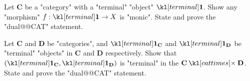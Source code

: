 \documentclass[main.tex]{subfiles}
\begin{document}
\begin{exer}\label{exer:duality:morterminal}
	Let $\mathbf{C}$ be a "category" with a "terminal" "object" $\terminal$. Show any "morphism" $f: \terminal \rightarrow X$ is "monic". State and prove the "dual@@CAT" statement.
\end{exer}
\begin{exer}\label{exer:duality:productterminal}
	Let $\mathbf{C}$ and $\mathbf{D}$ be "categories", and $\terminal_{\mathbf{C}}$ and $\terminal_{\mathbf{D}}$ be "terminal" "objects" in $\mathbf{C}$ and $\mathbf{D}$ respectively. Show that $(\terminal_{\mathbf{C}},\terminal_{\mathbf{D}})$ is "terminal" in the $\mathbf{C} \cattimes \mathbf{D}$. State and prove the "dual@@CAT" statement.
\end{exer}
\end{document}
